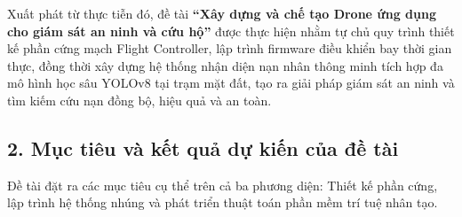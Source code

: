 Xuất phát từ thực tiễn đó, đề tài \textbf{``Xây dựng và chế tạo Drone ứng dụng cho giám sát an ninh và cứu hộ''} được thực hiện nhằm tự chủ quy trình thiết kế phần cứng mạch Flight Controller, lập trình firmware điều khiển bay thời gian thực, đồng thời xây dựng hệ thống nhận diện nạn nhân thông minh tích hợp đa mô hình học sâu YOLOv8 tại trạm mặt đất, tạo ra giải pháp giám sát an ninh và tìm kiếm cứu nạn đồng bộ, hiệu quả và an toàn.


\subsection*{2. Mục tiêu và kết quả dự kiến của đề tài}

Đề tài đặt ra các mục tiêu cụ thể trên cả ba phương diện: Thiết kế phần cứng, lập trình hệ thống nhúng và phát triển thuật toán phần mềm trí tuệ nhân tạo.

